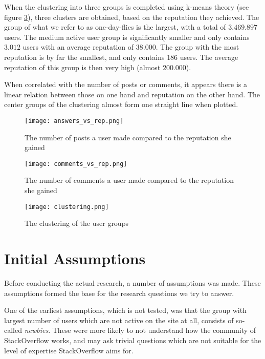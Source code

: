\documentclass[conference]{IEEEtran}
\begin{document}
When the clustering into three groups is completed using k-means theory (see
figure \ref{kmeans_clustering}), three clusters are obtained, based on the
reputation they achieved. The group of what we refer to as one-day-flies is the
largest, with a total of $3.469.897$ users. The medium active user group is
significantly smaller and only contains $3.012$ users with an average
reputation of $38.000$. The group with the most reputation is by far the
smallest, and only contains $186$ users. The average reputation of this group
is then very high (almost $200.000$).

When correlated with the number of posts or comments, it appears there is a
linear relation between those on one hand and reputation on the other hand. The
center groups of the clustering almost form one straight line when plotted.

\begin{figure}[h]
 \texttt{[image: answers\_vs\_rep.png]}
 \caption{The number of posts a user made compared to the reputation she gained}
 \label{answers_vs_rep}
\end{figure}

\begin{figure}[h]
 \texttt{[image: comments\_vs\_rep.png]}
 \caption{The number of comments a user made compared to the reputation she gained}
 \label{comments_vs_rep}
\end{figure}

\begin{figure}[h]
 \texttt{[image: clustering.png]}
 \caption{The clustering of the user groups}
 \label{kmeans_clustering}
\end{figure}


\section{Initial Assumptions} \label{InitialAssumptions}

Before conducting the actual research, a number of assumptions was made. These
assumptions formed the base for the research questions we try to answer.

One of the earliest assumptions, which is not tested, was that the group with
largest number of users which are not active on the site at all, consists of
so-called \textit{newbies}. These were more likely to not understand how the
community of StackOverflow works, and may ask trivial questions which are not
suitable for the level of expertise StackOverflow aims for.
\end{document}
